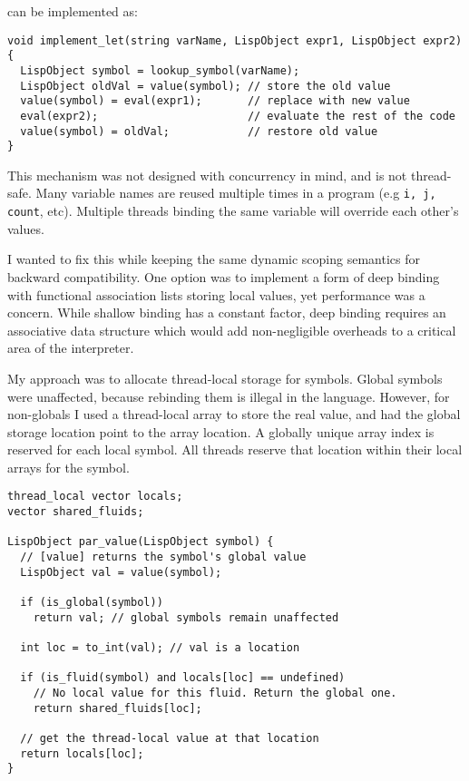 can be implemented as:

\begin{verbatim}
void implement_let(string varName, LispObject expr1, LispObject expr2) {
  LispObject symbol = lookup_symbol(varName);
  LispObject oldVal = value(symbol); // store the old value
  value(symbol) = eval(expr1);       // replace with new value
  eval(expr2);                       // evaluate the rest of the code
  value(symbol) = oldVal;            // restore old value
}
\end{verbatim}

This mechanism was not designed with concurrency in mind, and is not thread-safe.
Many variable names are reused multiple times in a program (e.g \texttt{i, j, count}, etc).
Multiple threads binding the same variable will override each other's values.

I wanted to fix this while keeping the same dynamic scoping semantics for backward compatibility.
One option was to implement a form of deep binding with functional association lists storing local values,
yet performance was a concern. While shallow binding has a constant factor, deep binding requires
an associative data structure which would add non-negligible overheads to a critical area of the
interpreter.

My approach was to allocate thread-local storage for symbols.
Global symbols were unaffected, because rebinding them is illegal in the language.
However, for non-globals I used a thread-local array to store the real value, and had the global storage
location point to the array location. A globally unique array index is reserved for each local symbol.
All threads reserve that location within their local arrays for the symbol.

\begin{verbatim}
thread_local vector locals;
vector shared_fluids;

LispObject par_value(LispObject symbol) {
  // [value] returns the symbol's global value
  LispObject val = value(symbol);

  if (is_global(symbol))
    return val; // global symbols remain unaffected

  int loc = to_int(val); // val is a location

  if (is_fluid(symbol) and locals[loc] == undefined)
    // No local value for this fluid. Return the global one.
    return shared_fluids[loc];

  // get the thread-local value at that location
  return locals[loc];
}
\end{verbatim}

